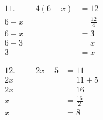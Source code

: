 \vspace{10 mm}
\begin{minipage}[t]{0.5\textwidth}
	\begin{align*}
		11.\hspace{30pt}4\left(6-x\right)&=12\\
		6-x&=\frac{12}{4}\\
		6-x&=3\\
		6-3&=x\\
		3&=x
	\end{align*}
\end{minipage}
\begin{minipage}[t]{0.5\textwidth}
	\begin{align*}
		12.\hspace{30pt}2x-5&=11\\
		2x&=11+5\\
		2x&=16\\
		x&=\frac{16}{2}\\
		x&=8
	\end{align*}
\end{minipage}
\vspace{10 mm}


